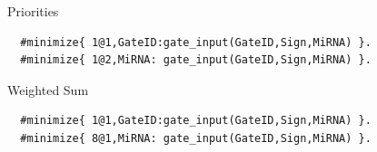 \documentclass[10pt,dvipsnames]{beamer}
\begin{document}
\begin{frame}[fragile]{Priorities}
 \begin{verbatim}
  #minimize{ 1@1,GateID:gate_input(GateID,Sign,MiRNA) }.
  #minimize{ 1@2,MiRNA: gate_input(GateID,Sign,MiRNA) }.
 \end{verbatim}
\end{frame}

\begin{frame}[fragile]{Weighted Sum}
 \begin{verbatim}
  #minimize{ 1@1,GateID:gate_input(GateID,Sign,MiRNA) }.
  #minimize{ 8@1,MiRNA: gate_input(GateID,Sign,MiRNA) }.
 \end{verbatim}
\end{frame}
\end{document}
